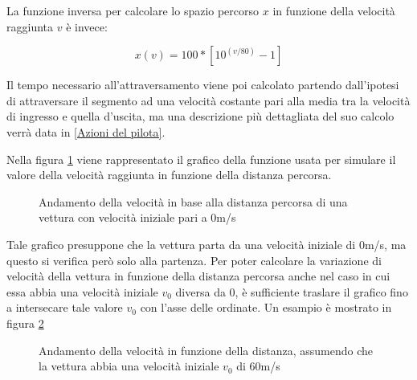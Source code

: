 \documentclass[a4paper,11pt, twoside]{book}
\begin{document}
	La funzione inversa per calcolare lo spazio percorso $x$ in funzione della velocità raggiunta $v$ è invece:
	
	$$x(v)=100*[10^{(v/80)}-1]$$
	
	Il tempo necessario all'attraversamento viene poi calcolato partendo dall'ipotesi di attraversare 
	il segmento ad una velocità
	costante pari alla media tra la velocità di ingresso e quella d'uscita, ma una descrizione più dettagliata
	del suo calcolo verrà data in \ref{Azioni del pilota}.
		
	Nella figura \ref{fgr:GraficoVelocita} viene rappresentato il grafico della funzione usata per simulare il valore
	della velocità raggiunta in funzione della distanza percorsa.
	
	\begin{figure}[ht]
	  \centering
	  \caption{Andamento della velocità in base alla distanza percorsa di una vettura con velocità iniziale
		    pari a 0m/s}
	  \label{fgr:GraficoVelocita}
	\end{figure}
	
	Tale grafico presuppone che la vettura parta da una velocità iniziale di 0m/s, ma questo si verifica però solo 
	alla partenza.
	Per poter calcolare la variazione di velocità della vettura in funzione della distanza percorsa anche nel caso
	in cui essa
	abbia una velocità iniziale $v_0$ diversa da 0, è sufficiente traslare il grafico fino a intersecare tale valore $v_0$
	con l'asse delle ordinate. Un esampio è mostrato in figura \ref{fgr:GraficoVelocitaTraslato}
	
	\begin{figure}[ht]
	  \centering
	  \caption{Andamento della velocità in funzione della distanza, assumendo che la vettura abbia una
		    velocità iniziale $v_0$ di 60m/s}
	  \label{fgr:GraficoVelocitaTraslato}

	\end{figure}
\end{document}
